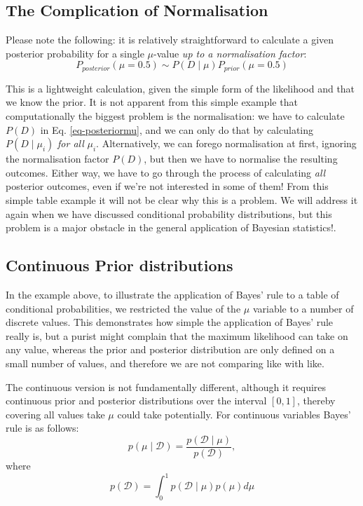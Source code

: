 \subsection{The Complication of Normalisation}

Please note the following: it is relatively straightforward to calculate a given posterior probability for a single $\mu$-value \emph{up to a normalisation factor}:
$$
P_{posterior}(\mu = 0.5) \sim P( D \mid \mu)P_{prior}(\mu = 0.5)
$$

This is a lightweight calculation, given the simple form of the likelihood and that we know the prior. It is not apparent from this simple example that computationally the
biggest problem is the normalisation: we have to calculate $P(D)$ in Eq. \ref{eq-posteriormu}, and we can only do that by calculating $P(D \mid \mu_i)$ \emph{for all}
$\mu_i$. Alternatively, we can forego normalisation at first, ignoring the normalisation factor $P( D )$, but then we have to normalise the resulting outcomes. Either way,
we have to go through the process of calculating \emph{all} posterior outcomes, even if we're not interested in some of them! From this simple table example it will not
be clear why this is a problem. We will address it again when we have discussed conditional probability distributions, but this problem is a major obstacle
in the general application of Bayesian statistics!.





\subsection{Continuous Prior distributions}


In the example above, to illustrate the application of Bayes' rule to a table of conditional probabilities, we restricted the value of the $\mu$ variable to a number of discrete values. This demonstrates how simple the application of Bayes' rule really is, but a purist might complain that the maximum likelihood can take on any value, whereas the prior and posterior distribution are only defined on a small number of values, and therefore
we are not comparing like with like.

The continuous version is not fundamentally different, although it requires continuous prior and posterior
distributions over the interval $[0,1]$, thereby covering all values take $\mu$ could take potentially.
For continuous variables Bayes' rule is as follows:
$$
p(\mu \mid \mathcal{D} ) = \frac{p(\mathcal{D} \mid \mu)} {p(\mathcal{D})},
$$
where
$$
p(\mathcal{D}) = \int^1_0 p(\mathcal{D} \mid \mu )p(\mu) d \mu
$$

